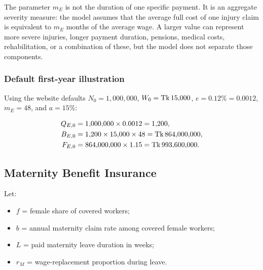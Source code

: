 \begin{interpretation}
The parameter $m_E$ is not the duration of one specific payment. It is an aggregate severity measure: the model assumes that the average full cost of one injury claim is equivalent to $m_E$ months of the average wage. A larger value can represent more severe injuries, longer payment duration, pensions, medical costs, rehabilitation, or a combination of these, but the model does not separate those components.
\end{interpretation}

\subsubsection*{Default first-year illustration}
Using the website defaults $N_0=1{,}000{,}000$, $W_0=\text{Tk}\,15{,}000$, $e=0.12\%=0.0012$, $m_E=48$, and $a=15\%$:

\begin{align}
Q_{E,0} &= 1{,}000{,}000\times0.0012=1{,}200,\\
B_{E,0} &=1{,}200\times15{,}000\times48=\text{Tk}\,864{,}000{,}000,\\
F_{E,0} &=864{,}000{,}000\times1.15=\text{Tk}\,993{,}600{,}000.
\end{align}

\subsection{Maternity Benefit Insurance}


Let:

\begin{itemize}
  \item $f$ = female share of covered workers;
  \item $b$ = annual maternity claim rate among covered female workers;
  \item $L$ = paid maternity leave duration in weeks;
  \item $r_M$ = wage-replacement proportion during leave.
\end{itemize}

